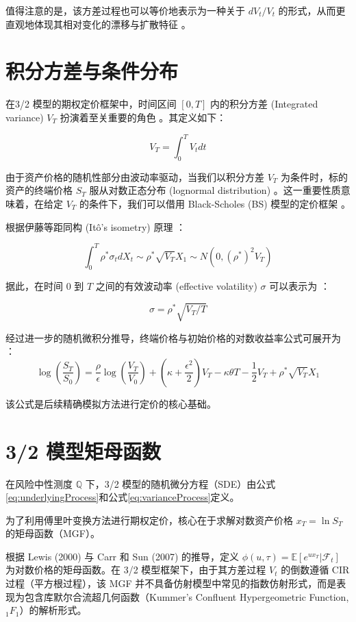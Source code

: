 值得注意的是，该方差过程也可以等价地表示为一种关于 $dV_t/V_t$ 的形式，从而更直观地体现其相对变化的漂移与扩散特征 。

\section{积分方差与条件分布}

在3/2 模型的期权定价框架中，时间区间 $[0, T]$ 内的积分方差 (Integrated variance) $V_T$ 扮演着至关重要的角色 。其定义如下：

\begin{equation}
    V_T = \int_0^T V_t dt
    \label{integratedVarianceDefinition}
\end{equation}

由于资产价格的随机性部分由波动率驱动，当我们以积分方差 $V_T$ 为条件时，标的资产的终端价格 $S_T$ 服从对数正态分布 (lognormal distribution) 。这一重要性质意味着，在给定 $V_T$ 的条件下，我们可以借用 Black-Scholes (BS) 模型的定价框架 。

根据伊藤等距同构 (Itô’s isometry) 原理 ：

$$\int_0^T \rho^* \sigma_t dX_t \sim \rho^* \sqrt{V_T} X_1 \sim N(0, (\rho^*)^2 V_T)$$

据此，在时间 $0$ 到 $T$ 之间的有效波动率 (effective volatility) $\sigma$ 可以表示为 ：

$$\sigma = \rho^* \sqrt{V_T / T}$$

经过进一步的随机微积分推导，终端价格与初始价格的对数收益率公式可展开为 ：
\begin{equation}
    \log\left(\frac{S_T}{S_0}\right) = \frac{\rho}{\epsilon}\log\left(\frac{V_T}{V_0}\right) + \left(\kappa + \frac{\epsilon^2}{2}\right)V_T - \kappa\theta T - \frac{1}{2}V_T + \rho^* \sqrt{V_T} X_1
    \label{priceFormulaForConditionalMC}
\end{equation}

该公式是后续精确模拟方法进行定价的核心基础。

\section{3/2 模型矩母函数}

在风险中性测度 $\mathbb{Q}$ 下，3/2 模型的随机微分方程（SDE）由公式\eqref{eq:underlyingProcess}和公式\eqref{eq:varianceProcess}定义。

为了利用傅里叶变换方法进行期权定价，核心在于求解对数资产价格 $x_T = \ln S_T$ 的矩母函数（MGF）。

根据 Lewis (2000) 与 Carr 和 Sun (2007) 的推导，定义 $\phi(u, \tau) = \mathbb{E}[e^{u x_T} | \mathcal{F}_t]$ 为对数价格的矩母函数。在 3/2 模型框架下，由于其方差过程 $V_t$ 的倒数遵循 CIR 过程（平方根过程），该 MGF 并不具备仿射模型中常见的指数仿射形式，而是表现为包含库默尔合流超几何函数（Kummer's Confluent Hypergeometric Function, $_1F_1$）的解析形式。

